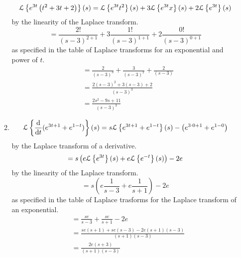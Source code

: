 \begin{enumerate}[label=\arabic*.]
\begin{enumerate}[label = (\alph*)]
\begin{equation*}
					\mathcal{L}\left\{ e^{3t}\left(t^2+3t+2\right) \right\}\left(s\right) = \mathcal{L}\left\{ e^{3t}t^2 \right\}\left(s\right) + 3\mathcal{L}\left\{ e^{3t}x \right\}\left(s\right) + 2\mathcal{L}\left\{ e^{3t} \right\}\left(s\right)
				\end{equation*}
				by the linearity of the Laplace transform.
				\begin{equation*}
					 = \frac{2!}{(s-3)^{2+1}} + 3\frac{1!}{(s-3)^{1+1}} + 2\frac{0!}{(s-3)^{0+1}}
				\end{equation*}
				as specified in the table of Laplace transforms for an exponential and power of $t$.
				\begin{align*}
					 &= \frac{2}{(s-3)^3} + \frac{3}{(s-3)^2} + \frac{2}{(s-3)} \\
					 &= \frac{2(s-3)^2 + 3(s-3) + 2}{(s-3)^3} \\
					 &= \frac{2s^2 - 9s + 11}{(s-3)^3}
				\end{align*}
			\item
				\begin{equation*}
					\mathcal{L}\left\{ \frac{\mathrm{d} }{\mathrm{d} t}{(e^{3t+1} + e^{1-t})} \right\}\left(s\right) = s\mathcal{L}\left\{ e^{3t+1} + e^{1-t} \right\}\left(s\right) - \left(e^{3\cdot 0 + 1} + e^{1-0}\right)
				\end{equation*}
				by the Laplace transform of a derivative.
				\begin{equation*}
					= s\left(e\mathcal{L}\left\{ e^{3t} \right\}\left(s\right) + e\mathcal{L}\left\{ e^{-t} \right\}\left(s\right)\right) - 2e
				\end{equation*}
				by the linearity of the Laplace transform.
				\begin{equation*}
					 = s\left(e\frac{1}{s-3} + e\frac{1}{s+1}\right) - 2e
				\end{equation*}
				as specified in the table of Laplace trasforms for the Laplace transform of an exponential.
				\begin{align*}
					&= \frac{se}{s-3} + \frac{se}{s+1} - 2e \\
					&= \frac{se(s+1) + se(s-3) -2e(s+1)(s-3)}{(s+1)(s-3)} \\
					&= \frac{2e(s+3)}{(s+1)(s-3)}
				\end{align*}

\end{enumerate}
\end{enumerate}
